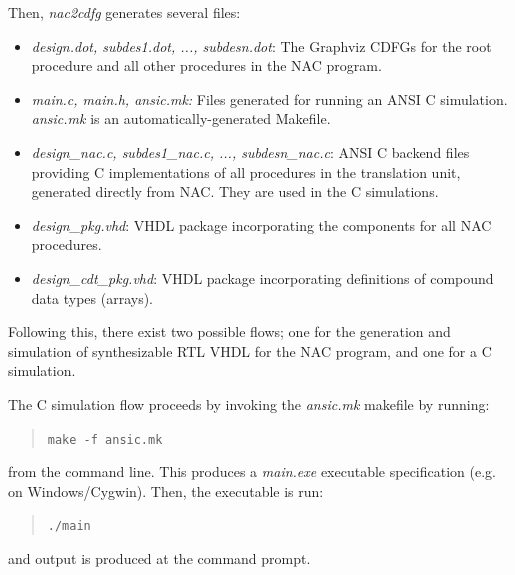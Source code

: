 \documentclass[a4paper]{article}
\providecommand*{\DUroletitlereference}[1]{\textsl{#1}}
\begin{document}
Then, \emph{nac2cdfg} generates several files:
%
\begin{itemize}

\item \DUroletitlereference{design.dot, subdes1.dot, ..., subdesn.dot}: The Graphviz CDFGs for the root
procedure and all other procedures in the NAC program.

\item \DUroletitlereference{main.c, main.h, ansic.mk:} Files generated for running an ANSI C simulation.
\DUroletitlereference{ansic.mk} is an automatically-generated Makefile.

\item \DUroletitlereference{design\_nac.c, subdes1\_nac.c, ..., subdesn\_nac.c}: ANSI C backend files
providing C implementations of all procedures in the translation unit, generated
directly from NAC. They are used in the C simulations.

\item \DUroletitlereference{design\_pkg.vhd}: VHDL package incorporating the components for all NAC
procedures.

\item \DUroletitlereference{design\_cdt\_pkg.vhd}: VHDL package incorporating definitions of compound data
types (arrays).

\end{itemize}

Following this, there exist two possible flows; one for the generation and
simulation of synthesizable RTL VHDL for the NAC program, and one for a C
simulation.

The C simulation flow proceeds by invoking the \DUroletitlereference{ansic.mk} makefile by running:
%
\begin{quote}

\texttt{make -f ansic.mk}

\end{quote}

from the command line. This produces a \DUroletitlereference{main.exe} executable specification
(e.g. on Windows/Cygwin). Then, the executable is run:
%
\begin{quote}

\texttt{./main}

\end{quote}

and output is produced at the command prompt.
\end{document}
